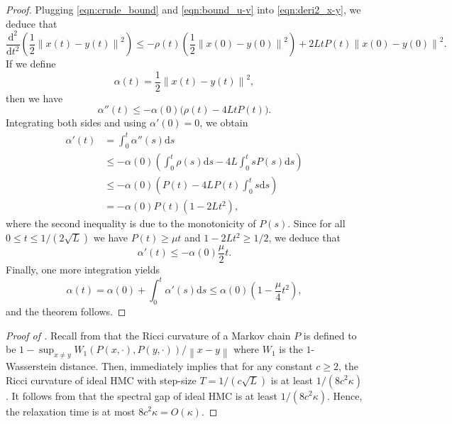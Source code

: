 \documentclass{toc}
\newcommand{\dif}{\mathrm{d}}
\newcommand{\norm}[1]{\left\lVert #1 \right\rVert}
\begin{document}
\begin{proof}
	Plugging \eqref{eqn:crude_bound} and \eqref{eqn:bound_u-v} into \eqref{eqn:deri2_x-y}, we deduce that
	\begin{equation*}
		\frac{\dif^2}{\dif t^2} \left( \frac{1}{2} \norm{x(t)-y(t)}^2 \right) 
		\le - \rho(t) \left( \frac{1}{2} \norm{x(0) - y(0)}^2 \right) + 2Lt P(t) \norm{x(0)-y(0)}^2. 
	\end{equation*}
	If we define
	\[
	\alpha(t) = \frac{1}{2} \norm{x(t)-y(t)}^2, 
	\]
	then we have 
	\[
	\alpha''(t) \le - \alpha(0) \big( \rho(t)  - 4L t P(t) \big).
	\]
	Integrating both sides and using $\alpha'(0) = 0$, we obtain
	\begin{align*}
		\alpha'(t) &= \int_{0}^t \alpha''(s) \dif s\\ 
		&\le - \alpha(0) \left( \int_{0}^t \rho(s) \dif s - 4L \int_{0}^t sP(s) \dif s \right)\\ 
		&\le - \alpha(0) \left( P(t) - 4L P(t) \int_{0}^t s \dif s \right)\\ 
		&= - \alpha(0) P(t) \left( 1 - 2Lt^2 \right), 
	\end{align*}
	where the second inequality is due to the monotonicity of $P(s)$. 
	Since for all $0\le t\le 1/(2\sqrt{L})$ we have $P(t) \ge \mu t$ and $1-2Lt^2 \ge 1/2$, we deduce that
	\[
	\alpha'(t) \le - \alpha(0) \frac{\mu}{2} t.
	\]
	Finally, one more integration yields
	\[
	\alpha(t) = \alpha(0) + \int_{0}^t \alpha'(s) \dif s \le \alpha(0) \left( 1 - \frac{\mu}{4} t^2 \right), 
	\]
	and the theorem follows.
\end{proof}

\begin{proof}[Proof of ]
	Recall from  that the Ricci curvature of a Markov chain $P$ is defined to be 
	$1 - \sup_{x\neq y} W_1(P(x, \cdot), P(y, \cdot)) / \norm{x-y}$ where $W_1$ is the $1$-Wasserstein distance. 
	Then,  immediately implies that for any constant $c\ge 2$, the Ricci curvature of ideal HMC with step-size $T=1/(c\sqrt{L})$ is at least $1/(8c^2\kappa)$. 
	It follows from \cite[Proposition 29]{O09} that the spectral gap of ideal HMC is at least $1/(8c^2\kappa)$. Hence, the relaxation time is
%
at most   %
$8c^2\kappa = O(\kappa)$.
\end{proof}
\end{document}
